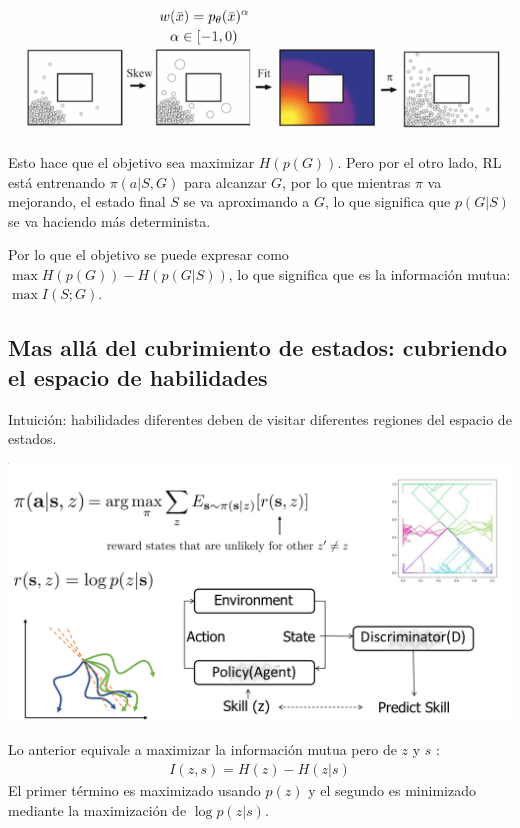 \begin{center}
\includegraphics[width=.6\textwidth]{figures/2020-08-07-142207_770x193_scrot.png}
\end{center}

Esto hace que el objetivo sea maximizar $H(p(G))$. Pero por el otro lado, RL está entrenando
$\pi(a|S,G)$ para alcanzar  $G$, por lo que mientras $\pi$ va mejorando, el estado final $S$ se
va aproximando a $G$, lo que significa que $p(G|S)$ se va haciendo más determinista.

Por lo que el objetivo se puede expresar como $\max H(p(G))-H(p(G|S))$, lo que significa que es
la información mutua: $\max I(S;G)$.

\subsection{Mas allá del cubrimiento de estados: cubriendo el espacio de habilidades}%
\label{sub:mas_allá_del_cubrimiento_de_estados_cubriendo_el_espacio_de_habilidades}

Intuición: habilidades diferentes deben de visitar diferentes regiones del espacio de estados.

\begin{center}
\includegraphics[width=.8\textwidth]{figures/2020-08-07-144241_1103x567_scrot.png}
\end{center}

Lo anterior equivale a maximizar la información mutua pero de $z$ y $s$ :
\begin{align}
    I(z,s)=H(z)-H(z|s)
\end{align}
El primer término es maximizado usando $p(z)$ y el segundo es minimizado mediante la
maximización de $\log p(z|s)$.

